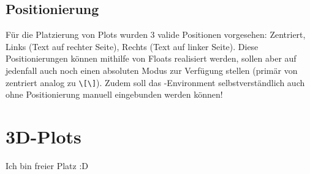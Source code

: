 \subsection{Positionierung}
Für die Platzierung von Plots wurden 3 valide Positionen vorgesehen: Zentriert, Links (Text auf rechter Seite), Rechts (Text auf linker Seite). Diese Positionierungen können mithilfe von Floats realisiert werden, sollen aber auf jedenfall auch noch einen absoluten Modus zur Verfügung stellen (primär von zentriert analog zu \verb|\[\]|). Zudem soll das -Environment selbstverständlich auch ohne Positionierung manuell eingebunden werden können!\newpage
\section{3D-Plots }
Ich bin freier Platz :D
\renewcommand{\arraystretch}{1}
